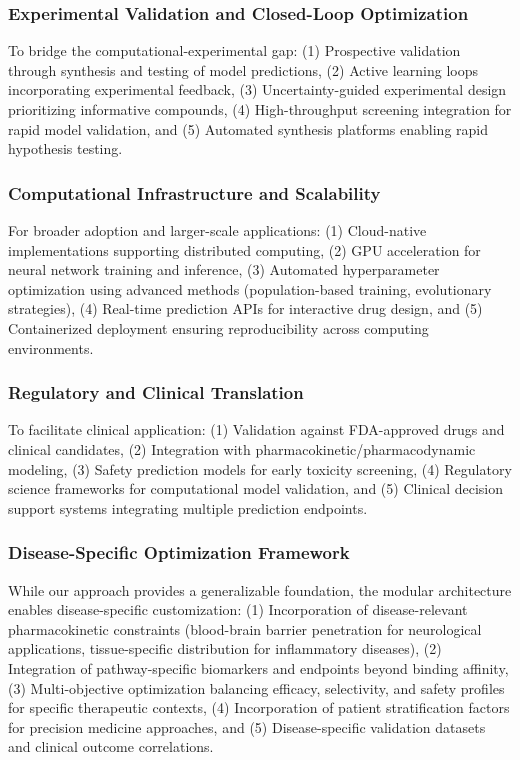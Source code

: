 \documentclass[preprint, 10pt]{elsarticle}
\begin{document}
\subsubsection{Experimental Validation and Closed-Loop Optimization}
To bridge the computational-experimental gap: (1) Prospective validation through synthesis and testing of model predictions, (2) Active learning loops incorporating experimental feedback, (3) Uncertainty-guided experimental design prioritizing informative compounds, (4) High-throughput screening integration for rapid model validation, and (5) Automated synthesis platforms enabling rapid hypothesis testing.

\subsubsection{Computational Infrastructure and Scalability}
For broader adoption and larger-scale applications: (1) Cloud-native implementations supporting distributed computing, (2) GPU acceleration for neural network training and inference, (3) Automated hyperparameter optimization using advanced methods (population-based training, evolutionary strategies), (4) Real-time prediction APIs for interactive drug design, and (5) Containerized deployment ensuring reproducibility across computing environments.

\subsubsection{Regulatory and Clinical Translation}
To facilitate clinical application: (1) Validation against FDA-approved drugs and clinical candidates, (2) Integration with pharmacokinetic/pharmacodynamic modeling, (3) Safety prediction models for early toxicity screening, (4) Regulatory science frameworks for computational model validation, and (5) Clinical decision support systems integrating multiple prediction endpoints.

\subsubsection{Disease-Specific Optimization Framework}
While our approach provides a generalizable foundation, the modular architecture enables disease-specific customization: (1) Incorporation of disease-relevant pharmacokinetic constraints (blood-brain barrier penetration for neurological applications, tissue-specific distribution for inflammatory diseases), (2) Integration of pathway-specific biomarkers and endpoints beyond binding affinity, (3) Multi-objective optimization balancing efficacy, selectivity, and safety profiles for specific therapeutic contexts, (4) Incorporation of patient stratification factors for precision medicine approaches, and (5) Disease-specific validation datasets and clinical outcome correlations.
\end{document}
